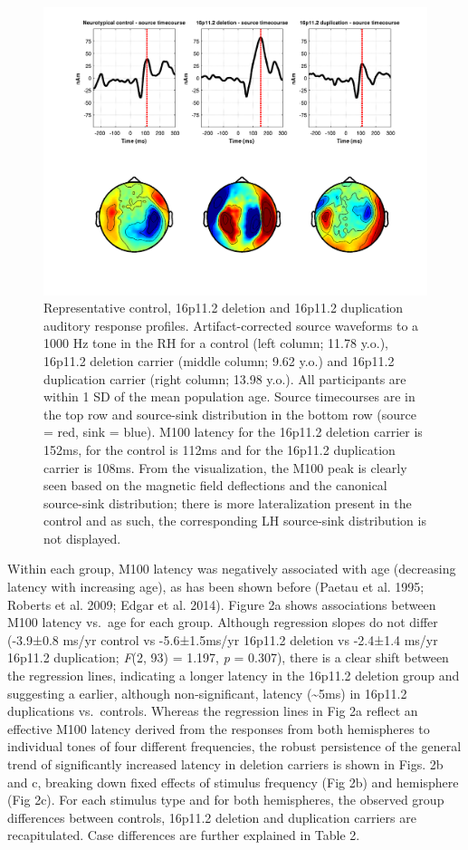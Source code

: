 \documentclass[]{article}
\begin{document}
\begin{figure}[htbp]
\centering
\includegraphics{figure-1-updated-final.png}
\caption{Representative control, 16p11.2 deletion and 16p11.2
duplication auditory response profiles. Artifact-corrected source
waveforms to a 1000 Hz tone in the RH for a control (left column; 11.78
y.o.), 16p11.2 deletion carrier (middle column; 9.62 y.o.) and 16p11.2
duplication carrier (right column; 13.98 y.o.). All participants are
within 1 SD of the mean population age. Source timecourses are in the
top row and source-sink distribution in the bottom row (source = red,
sink = blue). M100 latency for the 16p11.2 deletion carrier is 152ms,
for the control is 112ms and for the 16p11.2 duplication carrier is
108ms. From the visualization, the M100 peak is clearly seen based on
the magnetic field deflections and the canonical source-sink
distribution; there is more lateralization present in the control and as
such, the corresponding LH source-sink distribution is not displayed.}
\end{figure}

Within each group, M100 latency was negatively associated with age
(decreasing latency with increasing age), as has been shown before
(Paetau et al. 1995; Roberts et al. 2009; Edgar et al. 2014). Figure 2a
shows associations between M100 latency vs.~age for each group. Although
regression slopes do not differ (-3.9±0.8 ms/yr control vs -5.6±1.5ms/yr
16p11.2 deletion vs -2.4±1.4 ms/yr 16p11.2 duplication; \emph{F}(2, 93)
= 1.197, \emph{p} = 0.307), there is a clear shift between the
regression lines, indicating a longer latency in the 16p11.2 deletion
group and suggesting a earlier, although non-significant, latency
(\textasciitilde{}5ms) in 16p11.2 duplications vs.~controls. Whereas the
regression lines in Fig 2a reflect an effective M100 latency derived
from the responses from both hemispheres to individual tones of four
different frequencies, the robust persistence of the general trend of
significantly increased latency in deletion carriers is shown in Figs.
2b and c, breaking down fixed effects of stimulus frequency (Fig 2b) and
hemisphere (Fig 2c). For each stimulus type and for both hemispheres,
the observed group differences between controls, 16p11.2 deletion and
duplication carriers are recapitulated. Case differences are further
explained in Table 2.
\end{document}
